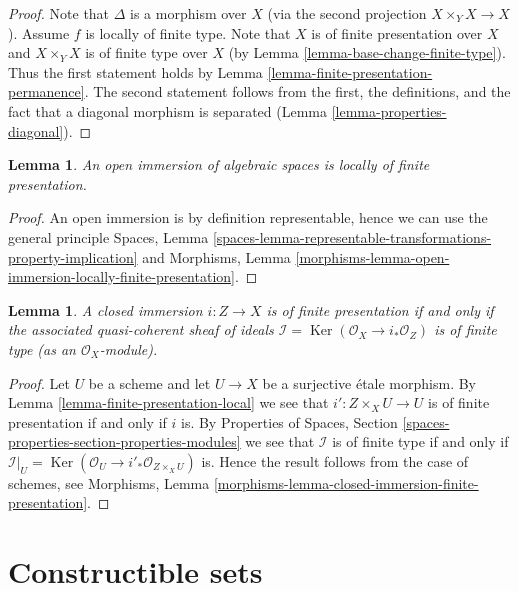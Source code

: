 \documentclass{stacks-project}
\theoremstyle{plain}
\newtheorem{lemma}[subsection]{Lemma}
\theoremstyle{definition}
\theoremstyle{remark}
\numberwithin{equation}{subsection}
\def\Ker{\mathop{\mathrm{Ker}}}
\begin{document}
\begin{proof}
Note that $\Delta$ is a morphism over $X$ (via the second
projection $X \times_Y X \to X$). Assume $f$ is locally of finite type.
Note that $X$ is of finite presentation over $X$ and $X \times_Y X$ is
of finite type over $X$ (by Lemma \ref{lemma-base-change-finite-type}).
Thus the first statement holds by
Lemma \ref{lemma-finite-presentation-permanence}.
The second statement follows from the first, the definitions, and
the fact that a diagonal morphism is separated
(Lemma \ref{lemma-properties-diagonal}).
\end{proof}

\begin{lemma}
\label{lemma-open-immersion-locally-finite-presentation}
An open immersion of algebraic spaces is locally of finite presentation.
\end{lemma}

\begin{proof}
An open immersion is by definition representable, hence we can
use the general principle
Spaces,
Lemma \ref{spaces-lemma-representable-transformations-property-implication}
and
Morphisms,
Lemma \ref{morphisms-lemma-open-immersion-locally-finite-presentation}.
\end{proof}

\begin{lemma}
\label{lemma-closed-immersion-finite-presentation}
A closed immersion $i : Z \to X$ is of finite presentation if and only if
the associated quasi-coherent sheaf of ideals
$\mathcal{I} = \Ker(\mathcal{O}_X \to i_*\mathcal{O}_Z)$
is of finite type (as an $\mathcal{O}_X$-module).
\end{lemma}

\begin{proof}
Let $U$ be a scheme and let $U \to X$ be a surjective \'etale morphism.
By Lemma \ref{lemma-finite-presentation-local}
we see that $i' : Z \times_X U \to U$ is of finite presentation if and
only if $i$ is. By Properties of Spaces, Section
\ref{spaces-properties-section-properties-modules}
we see that $\mathcal{I}$ is of finite type if and only if
$\mathcal{I}|_U = \Ker(\mathcal{O}_U \to i'_*\mathcal{O}_{Z \times_X U})$
is. Hence the result follows from the case of schemes, see Morphisms,
Lemma \ref{morphisms-lemma-closed-immersion-finite-presentation}.
\end{proof}







\section{Constructible sets}
\label{section-constructible}
\end{document}
